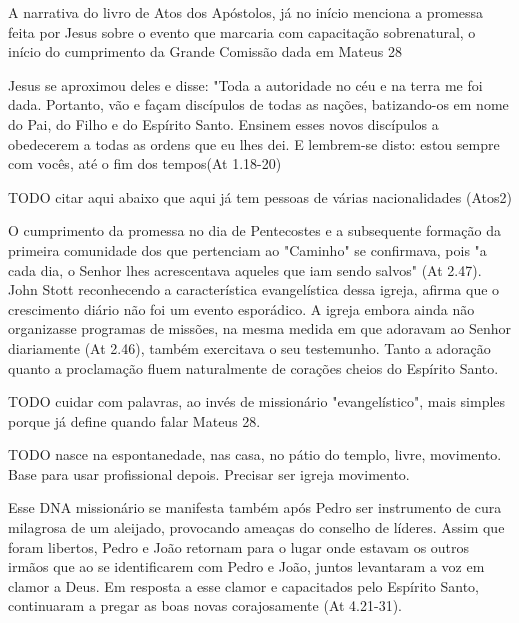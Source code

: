 \documentclass[
	12pt,				%
	openright,			%
	twoside,			%
	a4paper,			%
	english,			%
	french,				%
	spanish,			%
	brazil				%
	]{abntex2}
\begin{document}

 


A narrativa do livro de Atos dos Apóstolos, já no início menciona a promessa feita por Jesus sobre o evento que marcaria com capacitação sobrenatural, o início do cumprimento da Grande Comissão dada em Mateus 28
\begin{citacao}
Jesus se aproximou deles e disse: "Toda a autoridade no céu e na terra me foi dada. Portanto, vão e façam discípulos de todas as nações, batizando-os em nome do Pai, do Filho e do Espírito Santo. Ensinem esses novos discípulos a obedecerem a todas as ordens que eu lhes dei. E lembrem-se disto: estou sempre com vocês, até o fim dos tempos(At 1.18-20)
\end{citacao}

TODO citar aqui abaixo que aqui já tem pessoas de várias nacionalidades (Atos2)

O cumprimento da promessa no dia de Pentecostes e a subsequente formação da primeira comunidade dos que pertenciam ao "Caminho" se confirmava, pois "a cada dia, o Senhor lhes acrescentava aqueles que iam sendo salvos" (At 2.47). John Stott reconhecendo a característica evangelística dessa igreja, afirma que o crescimento diário não foi um evento esporádico. A igreja embora ainda não organizasse programas de missões, na mesma medida em que adoravam ao Senhor diariamente (At 2.46), também exercitava o seu testemunho. Tanto a adoração quanto a proclamação fluem naturalmente de corações cheios do Espírito Santo. \cite[118-119]{stott}

TODO cuidar com palavras, ao invés de missionário "evangelístico", mais simples porque já define quando falar Mateus 28.

TODO nasce na espontanedade, nas casa, no pátio do templo, livre, movimento. Base para usar profissional depois. Precisar ser igreja movimento.

Esse DNA missionário se manifesta também após Pedro ser instrumento de cura milagrosa de um aleijado, provocando ameaças do conselho de líderes. Assim que foram libertos, Pedro e João retornam para o lugar onde estavam os outros irmãos que ao se identificarem com Pedro e João, juntos levantaram a voz em clamor a Deus. Em resposta a esse clamor e capacitados pelo Espírito Santo, continuaram a pregar as boas novas corajosamente (At 4.21-31).
\end{document}
